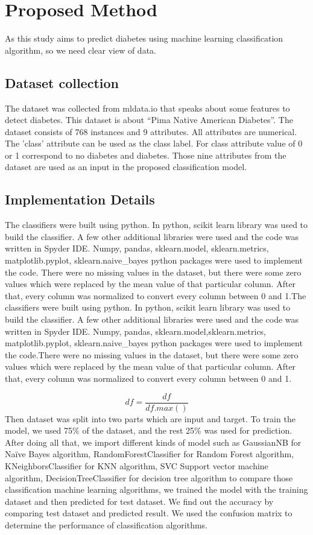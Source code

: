 \documentclass[conference]{IEEEtran}
\begin{document}
\section{Proposed Method}
	As this study aims to predict diabetes using machine learning classification algorithm, so we need clear view of data.
\subsection{Dataset collection}
	The dataset was collected from mldata.io that speaks about some features to detect diabetes. This dataset is about “Pima Native American Diabetes”. The dataset consists of 768 instances and 9 attributes. All attributes are numerical. The 'class' attribute can be used as the class label. For class attribute value of 0 or 1 correspond to no diabetes and diabetes. Those nine attributes from the dataset are used as an input in the proposed classification model.
\subsection{Implementation Details}
	The classifiers were built using python. In python, scikit learn library was used to build the classifier. A few other additional libraries
	were used and the code was written in Spyder IDE. Numpy, pandas, sklearn.model, sklearn.metrics, matplotlib.pyplot, sklearn.naive\_bayes python packages were used to implement the code. There were no missing values in the dataset, but there were some zero values which were replaced by the mean value of that particular column. After that, every column was normalized to convert every column between 0 and 1.The classifiers were built using python. In python, scikit learn library was used to build the classifier. A few other additional libraries were used and the code was written in Spyder IDE. Numpy, pandas, sklearn.model,sklearn.metrics, matplotlib.pyplot, sklearn.naive\_bayes python packages were used to implement the code.There were no missing values in the dataset, but there were some zero values which were replaced by the mean value of that particular column. After that, every column was normalized to convert every column between 0 and 1.
	
\begin{equation}
	df=\frac{df}{df.max()}
\end{equation}
	Then dataset was split into two parts which are input and target. To train the model, we used 75\% of the dataset, and the rest 25\% was used for prediction. After doing all that, we import different kinds of model such as GaussianNB for Naïve Bayes algorithm, RandomForestClassifier for Random Forest algorithm, KNeighborsClassifier for KNN algorithm, SVC Support vector machine algorithm, DecisionTreeClassifier for decision tree algorithm to compare those classification machine learning algorithms, we trained the model with the training dataset and then predicted for test dataset. We find out the accuracy by comparing test dataset and predicted result. We used the confusion matrix to determine the performance of classification algorithms.
	
\end{document}

